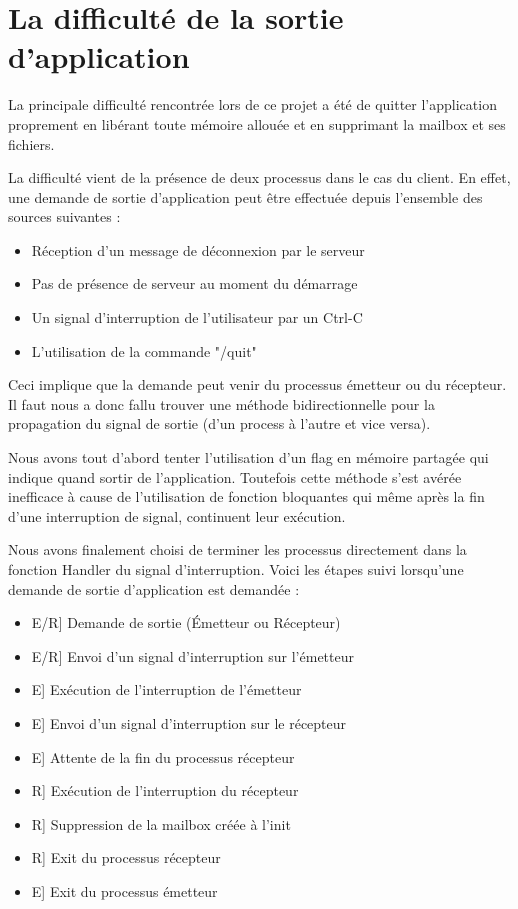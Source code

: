 \documentclass{article}
\begin{document}
	\section{La difficulté de la sortie d'application}
	\par La principale difficulté rencontrée lors de ce projet a été de quitter l'application proprement en libérant toute mémoire allouée et en supprimant la mailbox et ses fichiers.
	\par La difficulté vient de la présence de deux processus dans le cas du client. En effet, une demande de sortie d'application peut être effectuée depuis l'ensemble des sources suivantes :
	\begin{itemize}\renewcommand{\labelitemi}{$\bullet$} 
		\item Réception d'un message de déconnexion par le serveur
		\item Pas de présence de serveur au moment du démarrage
		\item Un signal d'interruption de l'utilisateur par un Ctrl-C
		\item L'utilisation de la commande "/quit" 
	\end{itemize}
	\par Ceci implique que la demande peut venir du processus émetteur ou du récepteur. Il faut nous a donc fallu trouver une méthode bidirectionnelle pour la propagation du signal de sortie (d'un process à l'autre et vice versa).
	\par Nous avons tout d'abord tenter l'utilisation d'un flag en mémoire partagée qui indique quand sortir de l'application. Toutefois cette méthode s'est avérée inefficace à cause de l'utilisation de fonction bloquantes qui même après la fin d'une interruption de signal, continuent leur exécution.
	\par Nous avons finalement choisi de terminer les processus directement dans la fonction Handler du signal d'interruption. Voici les étapes suivi lorsqu'une demande de sortie d'application est demandée :
	\begin{itemize}\renewcommand{\labelitemi}{$\bullet$} 
		\item E/R] Demande de sortie (Émetteur ou Récepteur)
		\item E/R] Envoi d'un signal d'interruption sur l'émetteur
		\item E] Exécution de l'interruption de l'émetteur
		\item E] Envoi d'un signal d'interruption sur le récepteur
		\item E] Attente de la fin du processus récepteur
		\item R] Exécution de l'interruption du récepteur
		\item R] Suppression de la mailbox créée à l'init
		\item R] Exit du processus récepteur
		\item E] Exit du processus émetteur
	\end{itemize}
\end{document}
